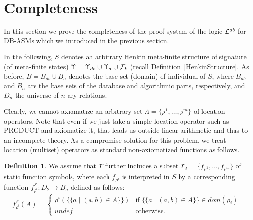 \documentclass[preprint,11pt]{elsarticle}
\theoremstyle{definition}
\newtheorem{definition}{Definition}[section]
\theoremstyle{remark}
\begin{document}
\section{Completeness}\label{sec:completeness}

In this section we prove the completeness of the proof system of the logic ${\cal L}^{db}$ for DB-ASMs which we introduced in the previous section.

In the following, $S$ denotes an arbitrary Henkin meta-finite structure of signature (of meta-finite states) $\Upsilon = \Upsilon_{db} \cup \Upsilon_a \cup {\cal F}_b$ (recall Definition~\ref{HenkinStructure}. As before, $B = B_{db} \cup B_a$ denotes the base set (domain) of individual of $S$, where $B_{db}$ and $B_a$ are the base sets of the database and algorithmic parts, respectively, and $D_n$ the universe of $n$-ary relations. 

Clearly, we cannot axiomatize an arbitrary set $\Lambda = \{\rho^1, \ldots, \rho^m\}$ of location operators. Note that even if we just take a simple location operator such as $\mathrm{PRODUCT}$ and axiomatize it, that leads us outside linear arithmetic and thus to an incomplete theory. 
As a compromise solution for this problem, we treat location (multiset) operators as standard non-axiomatized functions as follows. 

\begin{definition}\label{multisetOpAsFunc}
We assume that $\Upsilon$ further includes a subset $\Upsilon_\Lambda = \{f_{\rho^1}, \ldots, f_{\rho^m}\}$ of static function symbols, where each $f_{\rho^i}$ is interpreted in $S$ by a corresponding function $f^{S}_{\rho^i}: D_2 \rightarrow B_a$ defined as follows:  \[f^{S}_{\rho^i}(A) = \begin{cases} \rho^i(\{\!\!\{a \mid (a,b) \in A\}\!\!\}) & \text{if } \{\!\!\{a \mid (a,b) \in A\}\!\!\} \in \textit{dom}(\rho_i)  \\ \textit{undef} & \text{otherwise.} \end{cases}\] 
\end{definition}
\end{document}
